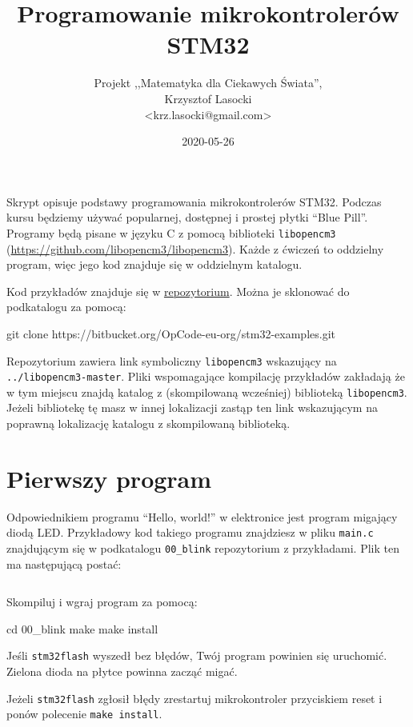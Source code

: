 \documentclass{pdfBooklets}
\title{Programowanie mikrokontrolerów STM32}
\author{%
	Projekt ,,Matematyka dla Ciekawych Świata'',\\
	Krzysztof Lasocki\\\normalsize\ttfamily <krz.lasocki@gmail.com>
}
\date  {2020-05-26}
\begin{document}
\maketitle

Skrypt opisuje podstawy programowania mikrokontrolerów STM32. Podczas kursu będziemy używać
popularnej, dostępnej i prostej płytki ``Blue Pill''. Programy będą pisane w języku
C z pomocą biblioteki \Verb$libopencm3$ (\url{https://github.com/libopencm3/libopencm3}).
Każde z ćwiczeń to oddzielny program, więc jego kod znajduje się w oddzielnym katalogu.

Kod przykładów znajduje się w \hyperref[repo]{repozytorium}. Można je sklonować do podkatalogu za pomocą:

\begin{CodeFrame*}[bash]{}
  git clone https://bitbucket.org/OpCode-eu-org/stm32-examples.git
\end{CodeFrame*}

Repozytorium zawiera link symboliczny \Verb$libopencm3$ wskazujący na \Verb$../libopencm3-master$.
Pliki wspomagające kompilację przykładów zakładają że w tym miejscu znajdą katalog z (skompilowaną wcześniej) biblioteką \Verb$libopencm3$.
Jeżeli bibliotekę tę masz w innej lokalizacji zastąp ten link wskazującym na poprawną lokalizację katalogu z skompilowaną biblioteką.


\section{Pierwszy program}
Odpowiednikiem programu ``Hello, world!'' w elektronice jest program migający diodą LED.
Przykładowy kod takiego programu znajdziesz w pliku \Verb$main.c$ znajdującym się w podkatalogu \Verb$00_blink$ repozytorium z przykładami.
Plik ten ma następującą postać:

\inputminted[frame=single,firstline=6]{c}{stm32-examples/00_blink/main.c}

Skompiluj i wgraj program za pomocą:

\begin{CodeFrame*}[bash]{}
cd 00_blink
make
make install
\end{CodeFrame*}

Jeśli \Verb$stm32flash$ wyszedł bez błędów, Twój program powinien się uruchomić. Zielona dioda na płytce powinna zacząć migać.

Jeżeli \Verb$stm32flash$ zgłosił błędy zrestartuj mikrokontroler przyciskiem reset i ponów polecenie \Verb$make install$.
\end{document}
